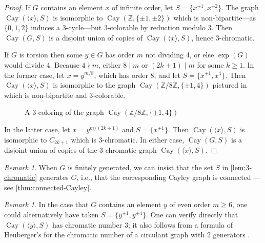 \documentclass[12pt,letterpaper]{amsart}
\theoremstyle{definition}
\theoremstyle{remark}
\newtheorem{remark}[theorem]{Remark}
\newcommand{\Z}{{\mathbb Z}}
\DeclareMathOperator{\Cay}{Cay}
\begin{document}
\begin{proof}
If $G$ contains an element $x$ of infinite order, let $S=\{x^{\pm 1},x^{\pm 2}\}$. The graph $\Cay(\langle x\rangle,S)$ is isomorphic to $\Cay(\Z,\{\pm 1,\pm2\})$ which is non-bipartite---as $\{0,1,2\}$ induces a 3-cycle---but 3-colorable by reduction modulo 3. Then $\Cay(G,S)$ is a disjoint union of copies of $\Cay(\langle x\rangle,S)$, hence 3-chromatic.

If $G$ is torsion then some $y\in G$ has order $m$ not dividing 4, or else $\exp(G)$ would divide 4. Because $4\nmid m$, either $8\mid m$ or $(2k+1)\mid m$ for some $k\geq 1$. In the former case, let $x=y^{m/8}$, which has order 8, and let $S=\{x^{\pm 1},x^4\}$. Then $\Cay(\langle x\rangle,S)$ is isomorphic to the graph $\Cay(\Z/8\Z,\{\pm 1,4\})$ pictured in  which is non-bipartite and 3-colorable. 
\begin{figure}[h]
\caption{A 3-coloring of the graph $\Cay(\Z/8\Z,\{\pm 1,4\})$}\label{fig:Z8}
\end{figure}
In the latter case, let $x=y^{m/(2k+1)}$ and $S=\{x^{\pm 1}\}$. Then $\Cay(\langle x\rangle,S)$ is isomorphic to $C_{2k+1}$ which is 3-chromatic. In either case, $\Cay(G,S)$ is a disjoint union of copies of the 3-chromatic graph $\Cay(\langle x\rangle,S)$.
\end{proof}

\begin{remark}
When $G$ is finitely generated, we can insist that the set $S$ in \cref{lem:3-chromatic} generates $G$, i.e., that the corresponding Cayley graph is connected --- see \cref{thm:connected-Cayley}.
\end{remark}

\begin{remark}
In the case that $G$ contains an element $y$ of even order $m\geq 6$, one could alternatively have taken $S=\{y^{\pm 1},y^{\pm 4}\}$. One can verify directly that $\Cay(\langle y\rangle,S)$ has chromatic number $3$; it also follows from a formula of Heuberger's for the chromatic number of a circulant graph with $2$ generators \cite{Heu}.
\end{remark}
\end{document}
